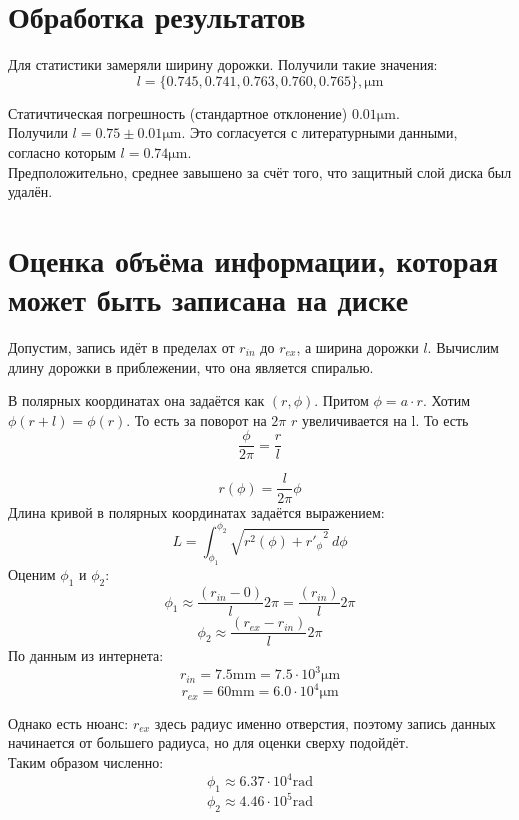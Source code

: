 \documentclass{article}
\begin{document}
\section{Обработка результатов}
Для статистики замеряли ширину дорожки. Получили такие значения:
$$l=\{0.745, 0.741, 0.763, 0.760, 0.765\}, \unit{\micro\meter}$$

Статичтическая погрешность (стандартное отклонение) $0.01  \unit{\micro\meter}$.\\


Получили $l = 0.75 \pm 0.01\unit{\micro\meter}$.
Это согласуется с литературными данными, согласно которым  $l = 0.74 \unit{\micro\meter}$.\\

Предположительно, среднее завышено за счёт того, что защитный слой диска был удалён.

\section{Оценка объёма информации, которая может быть записана на диске}
Допустим, запись идёт в пределах от $r_{in}$ до $r_{ex}$, а ширина дорожки $l$.
Вычислим длину дорожки в приблежении, что она является спиралью.

В полярных координатах она задаётся как $(r,\phi)$. Притом $\phi=a\cdot r$. Хотим $\phi(r+l)=\phi(r)$. То есть за поворот на $2\pi$ $r$ увеличивается на l. То есть $$\frac{\phi}{2\pi}=\frac{r}{l}$$

$$r(\phi)=\frac{l}{2\pi}\phi$$
Длина кривой в полярных координатах задаётся выражением:
$$L = \int_{\phi_1}^{\phi_2} \sqrt{r^2(\phi) + {r'_\phi}^2}\,d\phi$$
Оценим $\phi_1$ и $\phi_2$:
$$\phi_1\approx \frac{(r_{in}-0)}{l}2\pi=\frac{(r_{in})}{l}2\pi$$
$$\phi_2\approx \frac{(r_{ex}-r_{in})}{l}2\pi$$
По данным из интернета:
$$r_{in}=7.5\unit{\milli\meter}=7.5\cdot 10^3\unit{\micro\meter}$$
$$r_{ex}=60\unit{\milli\meter}=6.0\cdot10^4\unit{\micro\meter}$$

Однако есть нюанс: $r_{ex}$ здесь радиус именно отверстия, поэтому запись данных начинается от большего радиуса, но для оценки сверху подойдёт.\\

Таким образом численно:
$$\phi_1\approx 6.37\cdot10^4 \unit{\radian}$$
$$\phi_2\approx 4.46\cdot10^5 \unit{\radian}$$
\end{document}
